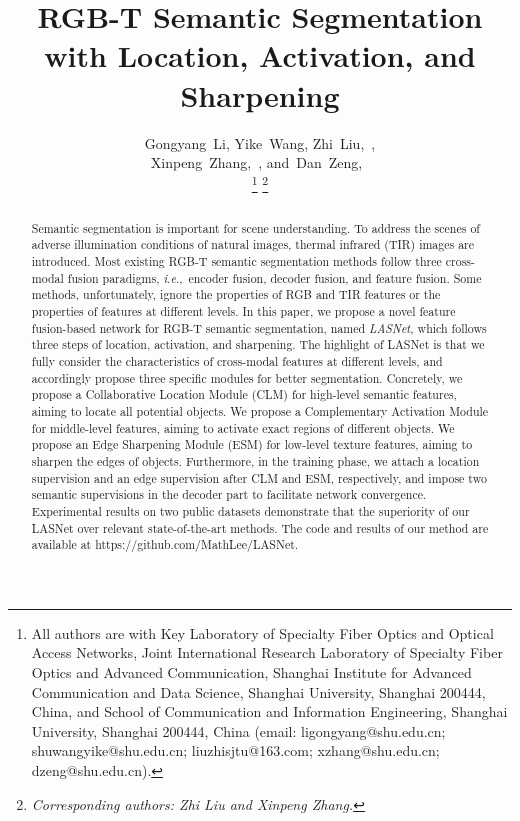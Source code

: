\documentclass[journal]{IEEEtran}
\newcommand{\ie}{\textit{i}.\textit{e}.,~}
\begin{document}
\title{RGB-T Semantic Segmentation with Location, Activation, and Sharpening}


\author{Gongyang~Li,
	Yike~Wang,
	Zhi~Liu,~,\\
	Xinpeng~Zhang,~,
	and~Dan~Zeng,~

        
\thanks{All authors are with Key Laboratory of Specialty Fiber Optics and Optical Access Networks, Joint International Research Laboratory of Specialty Fiber Optics and Advanced Communication, Shanghai Institute for Advanced Communication and Data Science, Shanghai University, Shanghai 200444, China, and School of Communication and Information Engineering, Shanghai University, Shanghai 200444, China (email: ligongyang@shu.edu.cn; shuwangyike@shu.edu.cn; liuzhisjtu@163.com; xzhang@shu.edu.cn; dzeng@shu.edu.cn).} \thanks{\textit{Corresponding authors: Zhi Liu and Xinpeng Zhang.}}
}





\maketitle

\begin{abstract}
Semantic segmentation is important for scene understanding.
To address the scenes of adverse illumination conditions of natural images, thermal infrared (TIR) images are introduced.
Most existing RGB-T semantic segmentation methods follow three cross-modal fusion paradigms, \ie encoder fusion, decoder fusion, and feature fusion.
Some methods, unfortunately, ignore the properties of RGB and TIR features or the properties of features at different levels.
In this paper, we propose a novel feature fusion-based network for RGB-T semantic segmentation, named \emph{LASNet}, which follows three steps of location, activation, and sharpening.
The highlight of LASNet is that we fully consider the characteristics of cross-modal features at different levels, and accordingly propose three specific modules for better segmentation.
Concretely, we propose a Collaborative Location Module (CLM) for high-level semantic features, aiming to locate all potential objects.
We propose a Complementary Activation Module for middle-level features, aiming to activate exact regions of different objects.
We propose an Edge Sharpening Module (ESM) for low-level texture features, aiming to sharpen the edges of objects.
Furthermore, in the training phase, we attach a location supervision and an edge supervision after CLM and ESM, respectively, and impose two semantic supervisions in the decoder part to facilitate network convergence.
Experimental results on two public datasets demonstrate that the superiority of our LASNet over relevant state-of-the-art methods.
The code and results of our method are available at https://github.com/MathLee/LASNet.
\end{abstract}
\end{document}
